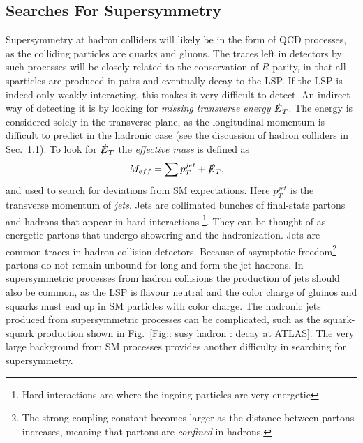 \documentclass[twoside,english]{uiofysmaster}
\begin{document}
\subsection{Searches For Supersymmetry}

Supersymmetry at hadron colliders will likely be in the form of QCD processes, as the colliding particles are quarks and gluons. The traces left in detectors by such processes will be closely related to the conservation of $R$-parity, in that all sparticles are produced in pairs and eventually decay to the LSP. If the LSP is indeed only weakly interacting, this makes it very difficult to detect. An indirect way of detecting it is by looking for \textit{missing transverse energy} $\slashed{E}_T$. The energy is considered solely in the transverse plane, as the longitudinal momentum is difficult to predict in the hadronic case (see the discussion of hadron colliders in Sec.\ 1.1). To look for $\slashed{E}_T$ the \textit{effective mass} is defined as
\begin{align}
M_{eff} &= \sum p_T^{jet} + \slashed{E}_T,
\end{align} 
and used to search for deviations from SM expectations. Here $p_T^{jet}$ is the transverse momentum of \textit{jets}. Jets are collimated bunches of final-state partons and hadrons that appear in hard interactions \footnote{Hard interactions are where the ingoing particles are very energetic}. They can be thought of as energetic partons that undergo showering and the hadronization. Jets are common traces in hadron collision detectors. Because of asymptotic freedom\footnote{The strong coupling constant becomes larger as the distance between partons increases, meaning that partons are \textit{confined} in hadrons.} partons do not remain unbound for long and form the jet hadrons. In supersymmetric processes from hadron collisions the production of jets should also be common, as the LSP is flavour neutral and the color charge of gluinos and squarks must end up in SM particles with color charge. The hadronic jets produced from supersymmetric processes can be complicated, such as the squark-squark production shown in Fig.~\ref{Fig:: susy hadron : decay at ATLAS}. The very large background from SM processes provides another difficulty in searching for supersymmetry. 
\end{document}
